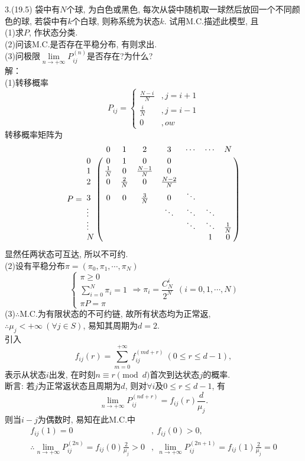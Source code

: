 3.(19.5) 袋中有$N$个球, 为白色或黑色, 每次从袋中随机取一球然后放回一个不同颜色的球, 若袋中有$k$个白球, 则称系统为状态$k$. 试用M.C.描述此模型, 且\\
(1)求$P$, 作状态分类.\\
(2)问该M.C.是否存在平稳分布, 有则求出.\\
(3)问极限$\lim\limits_{n\rightarrow +\infty}P^{(n)}_{ij}$是否存在?为什么?\\
解：\\
(1)转移概率
\[
P_{ij}=
\begin{cases}
\frac{N-i}{N}&, j = i + 1\\
\frac{i}{N}&, j = i - 1\\
0&,	ow
\end{cases}
\]
转移概率矩阵为
\[
P = 
\bordermatrix{
	~ & 0 & 1 & 2 & 3 & \cdots & \cdots & N \cr
	0 & 0 & 1 & 0 & 0 & ~  & ~  & ~ \cr
	1 & \frac{1}{N} & 0 & \frac{N-1}{N} & 0 & ~  & ~ & ~ \cr
	2 & 0 & \frac{2}{N} & 0 & \frac{N-2}{N} & ~  & ~ & ~ \cr
	3 & 0 & 0 & \frac{3}{N} & 0 & \ddots & ~ & ~ \cr
	\vdots & ~  & ~  & ~  & \ddots & \ddots& \ddots & ~ \cr
	\vdots & ~ & ~ & ~ & ~ & \ddots& \ddots & \frac{1}{N} \cr
	N & ~ & ~ & ~ & ~ & ~ & 1 & 0 \cr
}
\]
显然任两状态可互达, 所以不可约.\\
(2)设有平稳分布$\pi = (\pi_0, \pi_1, \cdots, \pi_N)$\\
\[
\begin{cases}
\pi \geqslant 0\\
\sum\limits^N_{i=0}\pi_i = 1\\
\pi P = \pi
\end{cases}
\Rightarrow
\pi_i = \frac{C^i_N}{2^N}~~(i = 0,1,\cdots,N)
\]
(3)$\therefore$M.C.为有限状态的不可约链, 故所有状态均为正常返,\\
$\therefore \mu_j < +\infty~(\forall j \in S)$, 易知其周期为$d = 2$.\\
引入
\[
f_{ij}(r) = \sum^{+\infty}_{m=0}f^{(md+r)}_{ij}~(0 \leqslant r \leqslant d-1),
\]
表示从状态$i$出发, 在时刻$n\equiv r\pmod d$首次到达状态$j$的概率.\\
断言: 若$j$为正常返状态且周期为$d$, 则对$\forall i\text{及}0 \leqslant r \leqslant d-1$, 有
\[
\lim_{n\rightarrow +\infty}P^{(nd+r)}_{ij} = f_{ij}(r)\frac{d}{\mu_j}.
\]
则当$i-j$为偶数时, 易知在此M.C.中
\[
\begin{split}
f_{ij}(1) = 0 &, ~f_{ij}(0) > 0,\\
\therefore \lim_{n\rightarrow +\infty}P^{(2n)}_{ij} = f_{ij}(0)\frac{2}{\mu_j} > 0 &, ~ \lim_{n\rightarrow +\infty}P^{(2n+1)}_{ij} = f_{ij}(1)\frac{2}{\mu_j} = 0
\end{split}
\]
